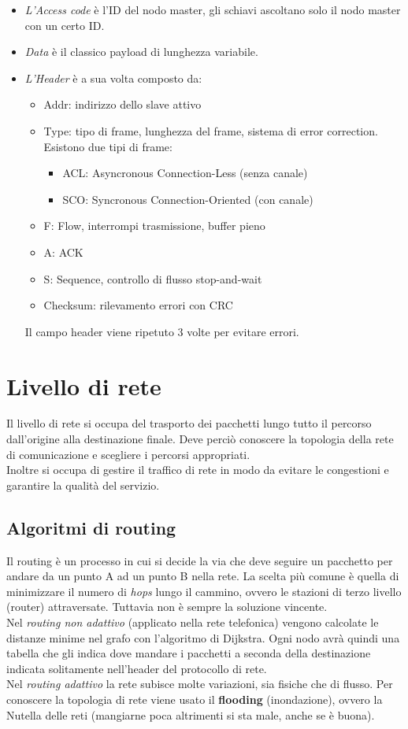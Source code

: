 \documentclass[10pt,a4paper,twoside]{article}
\begin{document}
\begin{itemize}
\item \textit{L'Access code} è l'ID del nodo master, gli schiavi ascoltano solo il nodo master con un certo ID.
\item \textit{Data} è il classico payload di lunghezza variabile.
\item \textit{L'Header} è a sua volta composto da:
	\begin{itemize}
	\item Addr: indirizzo dello slave attivo
	\item Type: tipo di frame, lunghezza del frame, sistema di error correction. Esistono due tipi di frame:
		\begin{itemize}
		\item ACL: Asyncronous Connection-Less (senza canale)
		\item SCO: Syncronous Connection-Oriented (con canale)
		\end{itemize}
	\item F: Flow, interrompi trasmissione, buffer pieno
	\item A: ACK
	\item S: Sequence, controllo di flusso stop-and-wait
	\item Checksum: rilevamento errori con CRC
	\end{itemize}
Il campo header viene ripetuto 3 volte per evitare errori.
\end{itemize}

\section{Livello di rete}
Il livello di rete si occupa del trasporto dei pacchetti lungo tutto il percorso dall'origine alla destinazione finale. Deve perciò conoscere la topologia della rete di comunicazione e scegliere i percorsi appropriati.\\
Inoltre si occupa di gestire il traffico di rete in modo da evitare le congestioni e garantire la qualità del servizio.

\subsection{Algoritmi di routing}
Il routing è un processo in cui si decide la via che deve seguire un pacchetto per andare da un punto A ad un punto B nella rete.
La scelta più comune è quella di minimizzare il numero di \textit{hops} lungo il cammino, ovvero le stazioni di terzo livello (router) attraversate. Tuttavia non è sempre la soluzione vincente.\\
 Nel \textit{routing non adattivo} (applicato nella rete telefonica) vengono calcolate le distanze minime nel grafo con l'algoritmo di Dijkstra. Ogni nodo avrà quindi una tabella che gli indica dove mandare i pacchetti a seconda della destinazione indicata solitamente nell'header del protocollo di rete.\\
Nel \textit{routing adattivo} la rete subisce molte variazioni, sia fisiche che di flusso. Per conoscere la topologia di rete viene usato il \textbf{flooding} (inondazione), ovvero la Nutella delle reti (mangiarne poca altrimenti si sta male, anche se è buona).
\end{document}
